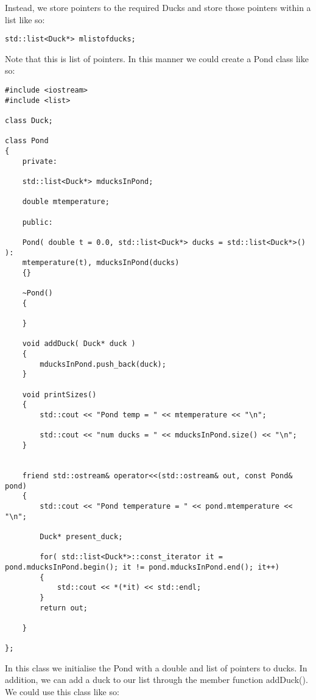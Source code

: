 Instead, we store pointers to the required Ducks and store those
pointers within a list like so:
\begin{verbatim}
std::list<Duck*> mlistofducks;
\end{verbatim}
Note that this is list of pointers. In this manner we could create a
Pond class like so:
\begin{lstlisting}
#include <iostream>
#include <list>

class Duck;

class Pond
{
	private:

	std::list<Duck*> mducksInPond;

	double mtemperature;

	public:

	Pond( double t = 0.0, std::list<Duck*> ducks = std::list<Duck*>() ):
	mtemperature(t), mducksInPond(ducks)
	{}

	~Pond()
	{

	}

	void addDuck( Duck* duck )
	{
		mducksInPond.push_back(duck);
	}

	void printSizes()
	{
		std::cout << "Pond temp = " << mtemperature << "\n";

		std::cout << "num ducks = " << mducksInPond.size() << "\n";
	}
	

	friend std::ostream& operator<<(std::ostream& out, const Pond& pond)
	{
		std::cout << "Pond temperature = " << pond.mtemperature << "\n";

		Duck* present_duck;
		
		for( std::list<Duck*>::const_iterator it = pond.mducksInPond.begin(); it != pond.mducksInPond.end(); it++)
		{
			std::cout << *(*it) << std::endl;
		}
		return out;
		
	}
	
};
\end{lstlisting}
In this class we initialise the Pond with a double and list of
pointers to ducks. In addition, we can add a duck to our list through
the member function addDuck(). We could use this class like so:
